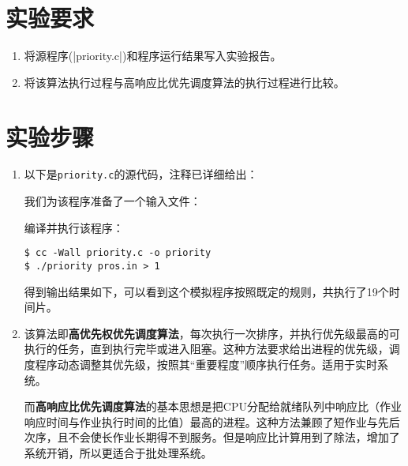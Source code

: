 \documentclass[c5size,a4paper,nofonts]{ctexart}
\begin{document}
\section{实验要求}
\begin{enumerate}[label={(\arabic*)}]
\item 将源程序(|priority.c|)和程序运行结果写入实验报告。
\item 将该算法执行过程与高响应比优先调度算法的执行过程进行比较。
\end{enumerate}

\fi

\section{实验步骤}

\begin{enumerate}

\item 以下是{\tt priority.c}的源代码，注释已详细给出：

{\small\linespread{1}}

我们为该程序准备了一个输入文件：


编译并执行该程序：

\begin{Verbatim}[frame=single]
$ cc -Wall priority.c -o priority
$ ./priority pros.in > 1
\end{Verbatim}

得到输出结果如下，可以看到这个模拟程序按照既定的规则，共执行了19个时间片。


\item 该算法即{\bf 高优先权优先调度算法}，每次执行一次排序，并执行优先级最高的可执行的任务，直到执行完毕或进入阻塞。这种方法要求给出进程的优先级，调度程序动态调整其优先级，按照其“重要程度”顺序执行任务。适用于实时系统。

而{\bf 高响应比优先调度算法}的基本思想是把CPU分配给就绪队列中响应比（作业响应时间与作业执行时间的比值）最高的进程。这种方法兼顾了短作业与先后次序，且不会使长作业长期得不到服务。但是响应比计算用到了除法，增加了系统开销，所以更适合于批处理系统。

\end{enumerate}
\end{document}
